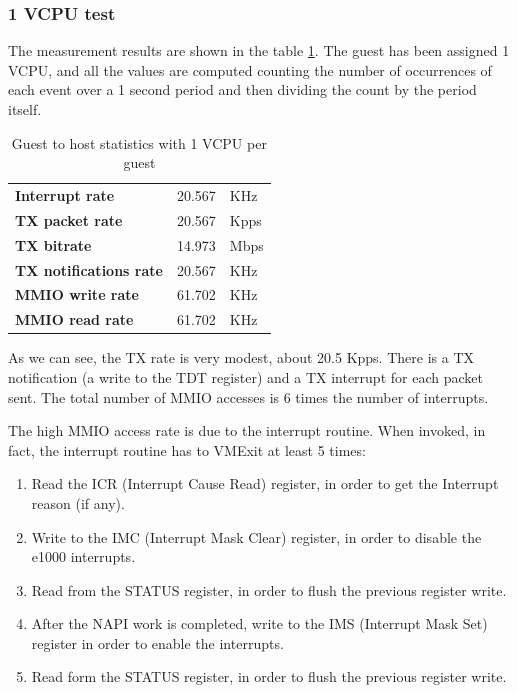 \subsubsection{1 VCPU test}
\label{sec:e1000-tx-g2h1vcpu}
The measurement results are shown in the table \ref{tab:e1000-tx-g2h1vcpu}. The guest has been assigned 1 VCPU, and all the values are
computed counting the number of occurrences of each event over a 1 second period and then dividing the count by the period itself.

\begin{table}
\begin{center}
\begin{tabular}{lrl}
\toprule
\textbf{Interrupt rate} & 20.567 & KHz\\
\textbf{TX packet rate} & 20.567 & Kpps\\
\textbf{TX bitrate} & 14.973 & Mbps\\
\textbf{TX notifications rate} & 20.567 & KHz\\
\textbf{MMIO write rate} & 61.702 & KHz\\
\textbf{MMIO read rate} & 61.702 & KHz\\
\bottomrule
\end{tabular}
\end{center}
\caption{Guest to host statistics with 1 VCPU per guest}
\label{tab:e1000-tx-g2h1vcpu}
\end{table}

As we can see, the TX rate is very modest, about 20.5 Kpps. There is a TX notification (a write to the TDT register) and a TX interrupt for 
each packet sent. The total number of MMIO accesses is 6 times the number of interrupts.

The high MMIO access rate is due to the interrupt routine. 
When invoked, in fact, the interrupt routine has to VMExit at least 5 times:
\begin{enumerate}
    \item Read the ICR (Interrupt Cause Read) register, in order to get the Interrupt reason (if any).
    \item Write to the IMC (Interrupt Mask Clear) register, in order to disable the e1000 interrupts.
    \item Read from the STATUS register, in order to flush the previous register write.
    \item After the NAPI work is completed, write to the IMS (Interrupt Mask Set) register in order to enable the interrupts.
    \item Read form the STATUS register, in order to flush the previous register write.
\end{enumerate}

